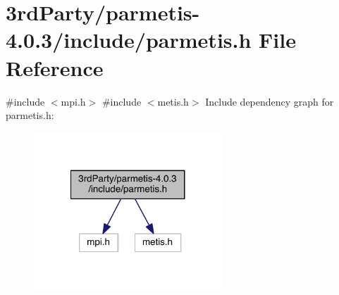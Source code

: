 \hypertarget{3rd_party_2parmetis-4_80_83_2include_2parmetis_8h}{}\section{3rd\+Party/parmetis-\/4.0.3/include/parmetis.h File Reference}
\label{3rd_party_2parmetis-4_80_83_2include_2parmetis_8h}
{\ttfamily \#include $<$mpi.\+h$>$}\newline
{\ttfamily \#include $<$metis.\+h$>$}\newline
Include dependency graph for parmetis.\+h\+:\nopagebreak
\begin{figure}[H]
\begin{center}
\leavevmode
\includegraphics[width=200pt]{3rd_party_2parmetis-4_80_83_2include_2parmetis_8h__incl}
\end{center}
\end{figure}
